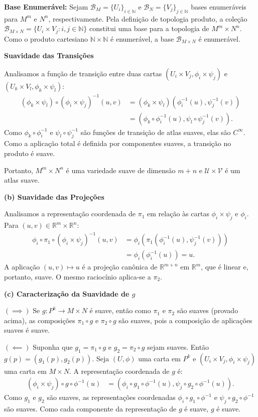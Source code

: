 {	\textbf{Base Enumerável:} Sejam $\mathcal{B}_M = \{U_i\}_{i \in \mathbb{N}}$ e $\mathcal{B}_N = \{V_j\}_{j \in \mathbb{N}}$ bases enumeráveis para $M^m$ e $N^n$, respectivamente. Pela definição de topologia produto, a coleção $\mathcal{B}_{M \times N} = \{ U_i \times V_j : i, j \in \mathbb{N} \}$ constitui uma base para a topologia de $M^m \times N^n$. Como o produto cartesiano $\mathbb{N} \times \mathbb{N}$ é enumerável, a base $\mathcal{B}_{M \times N}$ é enumerável.
	
	\textbf{Suavidade das Transições}
	
	Analisamos a função de transição entre duas cartas $(U_i \times V_j, \phi_i \times \psi_j)$ e $(U_k \times V_l, \phi_k \times \psi_l)$:
	\begin{align*}
		(\phi_k \times \psi_l) \circ (\phi_i \times \psi_j)^{-1}(u, v) &= (\phi_k \times \psi_l)(\phi_i^{-1}(u), \psi_j^{-1}(v)) \\
		&= (\phi_k \circ \phi_i^{-1}(u), \psi_l \circ \psi_j^{-1}(v)).
	\end{align*}
	Como $\phi_k \circ \phi_i^{-1}$ e $\psi_l \circ \psi_j^{-1}$ são funções de transição de atlas suaves, elas são $C^\infty$. Como a aplicação total é definida por componentes suaves, a transição no produto é suave.
	
	Portanto, $M^m \times N^n$ é uma variedade suave de dimensão $m+n$ e $\mathcal{U} \times \mathcal{V}$ é um atlas suave.
	
	\textbf{(b) Suavidade das Projeções}
	
	Analisamos a representação coordenada de $\pi_1$ em relação às cartas $\phi_i \times \psi_j$ e $\phi_i$. Para $(u, v) \in \mathbb{R}^m \times \mathbb{R}^n$:
	\begin{align*}
		\phi_i \circ \pi_1 \circ (\phi_i \times \psi_j)^{-1}(u, v) &= \phi_i(\pi_1(\phi_i^{-1}(u), \psi_j^{-1}(v))) \\
		&= \phi_i(\phi_i^{-1}(u)) = u.
	\end{align*}
	A aplicação $(u, v) \mapsto u$ é a projeção canônica de $\mathbb{R}^{m+n}$ em $\mathbb{R}^m$, que é linear e, portanto, suave. O mesmo raciocínio aplica-se a $\pi_2$.
	
	\textbf{(c) Caracterização da Suavidade de $g$}
	
	$(\implies)$ Se $g: P^k \to M \times N$ é suave, então como $\pi_1$ e $\pi_2$ são suaves (provado acima), as composições $\pi_1 \circ g$ e $\pi_2 \circ g$ são suaves, pois a composição de aplicações suaves é suave.
	
	$(\impliedby)$ Suponha que $g_1 = \pi_1 \circ g$ e $g_2 = \pi_2 \circ g$ sejam suaves. Então $g(p) = (g_1(p), g_2(p))$. Seja $(U, \phi)$ uma carta em $P^k$ e $(U_i \times V_j, \phi_i \times \psi_j)$ uma carta em $M \times N$. A representação coordenada de $g$ é:
	\begin{align*}
		(\phi_i \times \psi_j) \circ g \circ \phi^{-1}(u) &= (\phi_i \circ g_1 \circ \phi^{-1}(u), \psi_j \circ g_2 \circ \phi^{-1}(u)).
	\end{align*}
	Como $g_1$ e $g_2$ são suaves, as representações coordenadas $\phi_i \circ g_1 \circ \phi^{-1}$ e $\psi_j \circ g_2 \circ \phi^{-1}$ são suaves. Como cada componente da representação de $g$ é suave, $g$ é suave.
	
}
